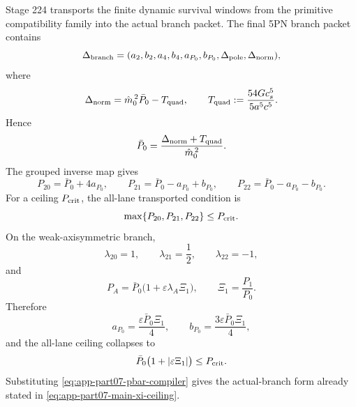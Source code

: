 Stage 224 transports the finite dynamic survival windows from the primitive compatibility family into the actual branch packet.  The final 5PN branch packet contains
\begin{equation}
\label{eq:app-part07-branch-packet-prefactor}
\Delta_{\rm branch}
=(a_2,b_2,a_4,b_4,a_{P_0},b_{P_0},\Delta_{\rm pole},\Delta_{\rm norm}),
\end{equation}
where
\begin{equation}
\label{eq:app-part07-delta-norm}
\Delta_{\rm norm}=\hat m_0^{\,2}\bar P_0-T_{\rm quad},
\qquad
T_{\rm quad}:=\frac{54Gc_s^5}{5a^5c^5}.
\end{equation}
Hence
\begin{equation}
\label{eq:app-part07-pbar-compiler}
\bar P_0=\frac{\Delta_{\rm norm}+T_{\rm quad}}{\hat m_0^{\,2}}.
\end{equation}
The grouped inverse map gives
\begin{equation}
\label{eq:app-part07-prefactor-lanes}
P_{20}=\bar P_0+4a_{P_0},
\qquad
P_{21}=\bar P_0-a_{P_0}+b_{P_0},
\qquad
P_{22}=\bar P_0-a_{P_0}-b_{P_0}.
\end{equation}
For a ceiling \(P_{\rm crit}\), the all-lane transported condition is
\begin{equation}
\label{eq:app-part07-max-prefactor-ceiling}
\max\{P_{20},P_{21},P_{22}\}\le P_{\rm crit}.
\end{equation}
On the weak-axisymmetric branch,
\begin{equation}
\label{eq:app-part07-lambda-signature}
\lambda_{20}=1,
\qquad
\lambda_{21}=\frac12,
\qquad
\lambda_{22}=-1,
\end{equation}
and
\begin{equation}
\label{eq:app-part07-xi-prefactor-form}
P_A=\bar P_0\bigl(1+\varepsilon\lambda_A\Xi_1\bigr),
\qquad
\Xi_1=\frac{P_1}{P_0}.
\end{equation}
Therefore
\begin{equation}
\label{eq:app-part07-ap0-bp0-xi}
a_{P_0}=\frac{\varepsilon\bar P_0\Xi_1}{4},
\qquad
b_{P_0}=\frac{3\varepsilon\bar P_0\Xi_1}{4},
\end{equation}
and the all-lane ceiling collapses to
\begin{equation}
\label{eq:app-part07-xi-prefactor-ceiling}
\bar P_0\bigl(1+|\varepsilon\Xi_1|\bigr)\le P_{\rm crit}.
\end{equation}
Substituting \cref{eq:app-part07-pbar-compiler} gives the actual-branch form already stated in \cref{eq:app-part07-main-xi-ceiling}.

